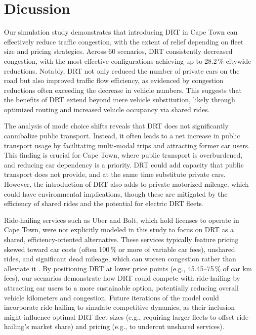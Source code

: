 \documentclass[main.tex]{subfiles}
\begin{document}
\section*{Dicussion}

Our simulation study demonstrates that introducing DRT in Cape Town can effectively reduce traffic congestion, with the extent of relief depending on fleet size and pricing strategies. Across 60 scenarios, DRT consistently decreased congestion, with the most effective configurations achieving up to 28.2\,\% citywide reductions. Notably, DRT not only reduced the number of private cars on the road but also improved traffic flow efficiency, as evidenced by congestion reductions often exceeding the decrease in vehicle numbers. This suggests that the benefits of DRT extend beyond mere vehicle substitution, likely through optimized routing and increased vehicle occupancy via shared rides. 

The analysis of mode choice shifts reveals that DRT does not significantly cannibalize public transport. Instead, it often leads to a net increase in public transport usage by facilitating multi-modal trips and attracting former car users. This finding is crucial for Cape Town, where public transport is overburdened, and reducing car dependency is a priority. DRT could add capacity that public transport does not provide, and at the same time substitute private cars. However, the introduction of DRT also adds to private motorized mileage, which could have environmental implications, though these are mitigated by the efficiency of shared rides and the potential for electric DRT fleets. 

Ride-hailing services such as Uber and Bolt, which hold licenses to operate in Cape Town, were not explicitly modeled in this study to focus on DRT as a shared, efficiency-oriented alternative. These services typically feature pricing skewed toward car costs (often 100\,\% or more of variable car fees), unshared rides, and significant dead mileage, which can worsen congestion rather than alleviate it \citep{Erhardt2019-rs} \citep{Tirachini2020-sr}. By positioning DRT at lower price points (e.g., 45.45–75\,\% of car km fees), our scenarios demonstrate how DRT could compete with ride-hailing by attracting car users to a more sustainable option, potentially reducing overall vehicle kilometers and congestion. Future iterations of the model could incorporate ride-hailing to simulate competitive dynamics, as their inclusion might influence optimal DRT fleet sizes (e.g., requiring larger fleets to offset ride-hailing's market share) and pricing (e.g., to undercut unshared services). 
\end{document}
